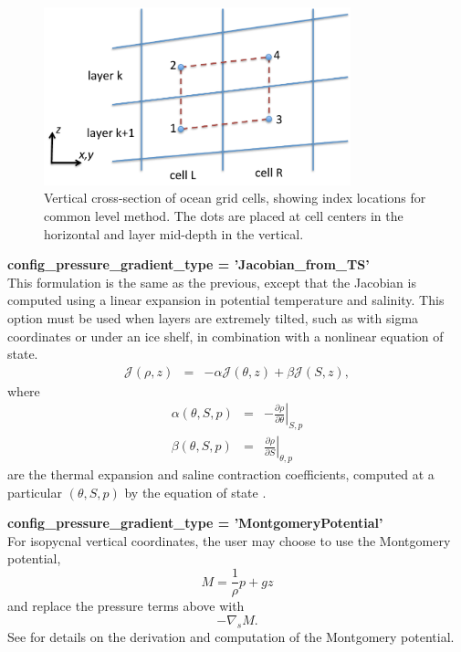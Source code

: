 \begin{figure}[htb]
\centering
\includegraphics[width=3.5in]{ocean/figures/common_level.pdf}
\caption{Vertical cross-section of ocean grid cells, showing index locations for common level method.  The dots are placed at cell centers in the horizontal and layer mid-depth in the vertical.}
\label{oceanFigure:\mode_common level}
\end{figure}

{\bf config\_pressure\_gradient\_type = 'Jacobian\_from\_TS'}\\
This formulation is the same as the previous, except that the Jacobian is computed using a linear expansion in potential temperature and salinity.  This option must be used when layers are extremely tilted, such as with sigma coordinates or under an ice shelf, in combination with a nonlinear equation of state.
\begin{eqnarray}
 {\mathcal J}(\rho,z) &=& -\alpha  {\mathcal J}(\theta,z) + \beta  {\mathcal J}(S,z), 
\end{eqnarray}
where
\begin{eqnarray}
\alpha\left( \theta, S, p\right) &=&  -\left. \frac{\partial \rho}{\partial \theta} \right|_{S,p} \\
\beta\left( \theta, S, p\right) &=&  \left. \frac{\partial \rho}{\partial S} \right|_{\theta,p} 
\end{eqnarray}
are the thermal expansion and saline contraction coefficients, computed at a particular  $\left(\theta, S, p\right)$ by the equation of state \citep[eqn 7.16]{Shchepetkin_McWilliams03jgr}.

{\bf config\_pressure\_gradient\_type = 'MontgomeryPotential'}\\
For isopycnal vertical coordinates, the user may choose to use the Montgomery potential,
\begin{equation}
\label{ocean:\mode_Montgomery Potential}
M = \frac{1}{\rho}p+gz
\end{equation}
and replace the pressure terms above with
\begin{equation}
- \nabla_s M.
\end{equation}
See \citet[section 2.1]{Higdon05jcp} for details on the derivation and computation of the Montgomery potential.

